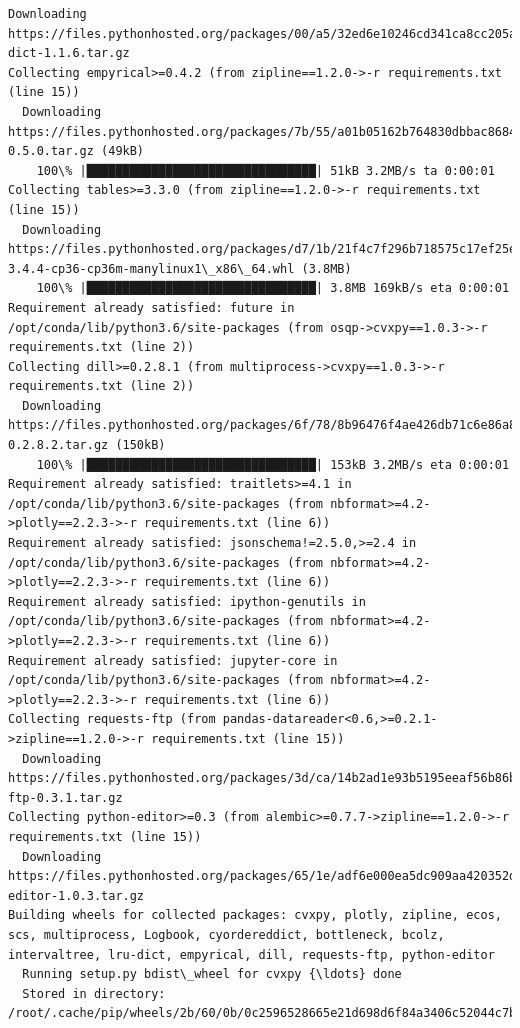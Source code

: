 \documentclass[11pt]{article}
\begin{document}
\begin{Verbatim}[commandchars=\\\{\}]
  Downloading https://files.pythonhosted.org/packages/00/a5/32ed6e10246cd341ca8cc205acea5d208e4053f48a4dced2b1b31d45ba3f/lru-dict-1.1.6.tar.gz
Collecting empyrical>=0.4.2 (from zipline==1.2.0->-r requirements.txt (line 15))
  Downloading https://files.pythonhosted.org/packages/7b/55/a01b05162b764830dbbac868462f44cd847a5b6523a01ca9f955721819da/empyrical-0.5.0.tar.gz (49kB)
    100\% |████████████████████████████████| 51kB 3.2MB/s ta 0:00:01
Collecting tables>=3.3.0 (from zipline==1.2.0->-r requirements.txt (line 15))
  Downloading https://files.pythonhosted.org/packages/d7/1b/21f4c7f296b718575c17ef25e61c05742a283c45077b4c8d5a190b3e0b59/tables-3.4.4-cp36-cp36m-manylinux1\_x86\_64.whl (3.8MB)
    100\% |████████████████████████████████| 3.8MB 169kB/s eta 0:00:01
Requirement already satisfied: future in /opt/conda/lib/python3.6/site-packages (from osqp->cvxpy==1.0.3->-r requirements.txt (line 2))
Collecting dill>=0.2.8.1 (from multiprocess->cvxpy==1.0.3->-r requirements.txt (line 2))
  Downloading https://files.pythonhosted.org/packages/6f/78/8b96476f4ae426db71c6e86a8e6a81407f015b34547e442291cd397b18f3/dill-0.2.8.2.tar.gz (150kB)
    100\% |████████████████████████████████| 153kB 3.2MB/s eta 0:00:01
Requirement already satisfied: traitlets>=4.1 in /opt/conda/lib/python3.6/site-packages (from nbformat>=4.2->plotly==2.2.3->-r requirements.txt (line 6))
Requirement already satisfied: jsonschema!=2.5.0,>=2.4 in /opt/conda/lib/python3.6/site-packages (from nbformat>=4.2->plotly==2.2.3->-r requirements.txt (line 6))
Requirement already satisfied: ipython-genutils in /opt/conda/lib/python3.6/site-packages (from nbformat>=4.2->plotly==2.2.3->-r requirements.txt (line 6))
Requirement already satisfied: jupyter-core in /opt/conda/lib/python3.6/site-packages (from nbformat>=4.2->plotly==2.2.3->-r requirements.txt (line 6))
Collecting requests-ftp (from pandas-datareader<0.6,>=0.2.1->zipline==1.2.0->-r requirements.txt (line 15))
  Downloading https://files.pythonhosted.org/packages/3d/ca/14b2ad1e93b5195eeaf56b86b7ecfd5ea2d5754a68d17aeb1e5b9f95b3cf/requests-ftp-0.3.1.tar.gz
Collecting python-editor>=0.3 (from alembic>=0.7.7->zipline==1.2.0->-r requirements.txt (line 15))
  Downloading https://files.pythonhosted.org/packages/65/1e/adf6e000ea5dc909aa420352d6ba37f16434c8a3c2fa030445411a1ed545/python-editor-1.0.3.tar.gz
Building wheels for collected packages: cvxpy, plotly, zipline, ecos, scs, multiprocess, Logbook, cyordereddict, bottleneck, bcolz, intervaltree, lru-dict, empyrical, dill, requests-ftp, python-editor
  Running setup.py bdist\_wheel for cvxpy {\ldots} done
  Stored in directory: /root/.cache/pip/wheels/2b/60/0b/0c2596528665e21d698d6f84a3406c52044c7b4ca6ac737cf3

\end{Verbatim}
\end{document}

